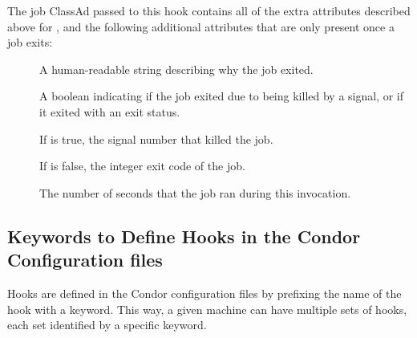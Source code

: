The job ClassAd passed to this hook contains all of the extra
attributes described above for , and
the following additional attributes that are only present once a job
exits:
\begin{description}
\item[]
  A human-readable string describing why the job exited.

\item[]
  A boolean indicating if the job exited due to being killed by a
  signal, or if it exited with an exit status.

\item[]
  If  is true, the signal number that killed the job.

\item[]
  If  is false, the integer exit code of the job.

\item[]
  The number of seconds that the job ran during this invocation.
\end{description}


% 


\subsection{\label{sec:job-hooks-keywords}
Keywords to Define Hooks in the Condor Configuration files }

Hooks are defined in the Condor configuration files by prefixing
the name of the hook with a keyword.
This way, a given machine can have multiple sets of hooks, each set
identified by a specific keyword.

